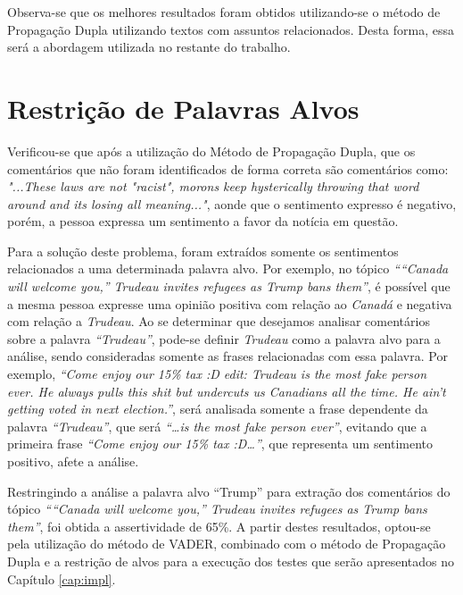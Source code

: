 Observa-se que os melhores resultados foram obtidos utilizando-se o método de
Propagação Dupla utilizando textos com assuntos relacionados. Desta forma, essa
será a abordagem utilizada no restante do trabalho.

\section{Restrição de Palavras Alvos}

Verificou-se que após a utilização do Método de Propagação Dupla, que os
comentários que não foram identificados de forma correta são comentários como: \textit{"...These laws are not "racist", morons keep hysterically throwing that word around and
its losing all meaning..."}, aonde que o sentimento expresso é negativo, porém,
a pessoa expressa um sentimento a favor da notícia em questão. 

Para a solução deste problema, foram extraídos somente os sentimentos
relacionados a uma determinada palavra alvo. Por exemplo, no tópico \textit{````Canada will
welcome you,'' Trudeau invites refugees as Trump bans them''}, é possível que a mesma pessoa expresse uma opinião positiva com relação
ao \textit{Canadá} e negativa com relação a \textit{Trudeau}. Ao se determinar
que desejamos analisar comentários sobre a palavra \textit{``Trudeau''},
pode-se definir \textit{Trudeau} como a palavra alvo para a análise,
sendo consideradas somente as frases relacionadas com essa palavra. Por exemplo, \textit{``Come enjoy our 15\%
tax :D edit: Trudeau is the most fake person ever. He always pulls this shit but
undercuts us Canadians all the time. He ain't getting voted in next
election.''}, será analisada somente a frase dependente da palavra
\textit{``Trudeau''}, que será \textit{``\ldots is the most fake person ever''},
evitando que a primeira frase \textit{``Come enjoy our 15\% tax :D\ldots''}, que
representa um sentimento positivo, afete a análise.

Restringindo a análise a palavra alvo ``Trump'' para extração dos comentários do
tópico \textit{````Canada will welcome you,'' Trudeau invites refugees as Trump
bans them''}, foi obtida a assertividade de 65\%. A partir destes resultados,
optou-se pela utilização do método de \ac{VADER}, combinado com o método de Propagação Dupla e a
restrição de alvos para a execução dos testes que serão apresentados no Capítulo
\ref{cap:impl}.



